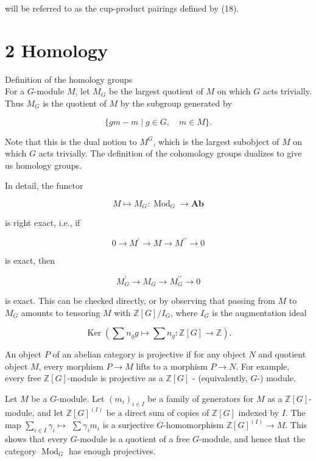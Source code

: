\documentclass[10pt]{article}
\begin{document}
will be referred to as the cup-product pairings defined by (18).

\section*{2 Homology}
Definition of the homology groups\\
For a $G$-module $M$, let $M_{G}$ be the largest quotient of $M$ on which $G$ acts trivially. Thus $M_{G}$ is the quotient of $M$ by the subgroup generated by

$$
\{g m-m \mid g \in G, \quad m \in M\} .
$$

Note that this is the dual notion to $M^{G}$, which is the largest subobject of $M$ on which $G$ acts trivially. The definition of the cohomology groups dualizes to give us homology groups.

In detail, the functor

$$
M \mapsto M_{G}: \operatorname{Mod}_{G} \rightarrow \mathbf{A b}
$$

is right exact, i.e., if

$$
0 \rightarrow M^{\prime} \rightarrow M \rightarrow M^{\prime \prime} \rightarrow 0
$$

is exact, then

$$
M_{G}^{\prime} \rightarrow M_{G} \rightarrow M_{G}^{\prime \prime} \rightarrow 0
$$

is exact. This can be checked directly, or by observing that passing from $M$ to $M_{G}$ amounts to tensoring $M$ with $\mathbb{Z}[G] / I_{G}$, where $I_{G}$ is the augmentation ideal

$$
\operatorname{Ker}\left(\sum n_{g} g \mapsto \sum n_{g}: \mathbb{Z}[G] \rightarrow \mathbb{Z}\right) .
$$

An object $P$ of an abelian category is projective if for any object $N$ and quotient object $M$, every morphism $P \rightarrow M$ lifts to a morphism $P \rightarrow N$. For example, every free $\mathbb{Z}[G]$-module is projective as a $\mathbb{Z}[G]$ - (equivalently, $G$-) module.

Let $M$ be a $G$-module. Let $\left(m_{i}\right)_{i \in I}$ be a family of generators for $M$ as a $\mathbb{Z}[G]$-module, and let $\mathbb{Z}[G]^{(I)}$ be a direct sum of copies of $\mathbb{Z}[G]$ indexed by $I$. The map $\sum_{i \in I} \gamma_{i} \mapsto$ $\sum \gamma_{i} m_{i}$ is a surjective $G$-homomorphism $\mathbb{Z}[G]^{(I)} \rightarrow M$. This shows that every $G$-module is a quotient of a free $G$-module, and hence that the category $\operatorname{Mod}_{G}$ has enough projectives.
\end{document}
